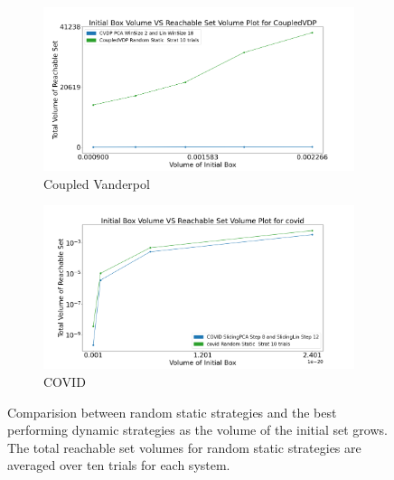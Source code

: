 \begin{figure}[h!]
    \hspace{-1.5em}
    \begin{subfigure}{0.5\textwidth}
    \centering
    \includegraphics[width=1.1\textwidth, height=0.75\textwidth]{figures/InitVolVSReachVol/CVDPInitReachVolRanStrat.png}
    \caption{Coupled Vanderpol}
    \end{subfigure}%
    \begin{subfigure}{0.5\textwidth}
    \centering
    \includegraphics[width=1.1\textwidth, height=0.75\textwidth]{figures/InitVolVSReachVol/CovidInitReachVolRanStrat.png}
    \caption{COVID}
    \end{subfigure}

    \caption{Comparision between random static strategies and the best performing dynamic strategies as the volume of the initial set grows. The total reachable set volumes for random static strategies are averaged over ten trials for each system.}
    \label{fig:RanStaticStratComp}
\end{figure}
\newpage
